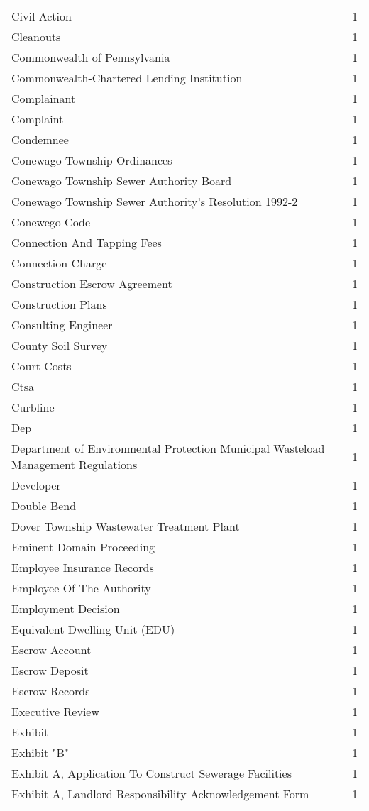 \begin{longtable}{p{} p{}}
Civil Action & 1 \\
Cleanouts & 1 \\
Commonwealth of Pennsylvania & 1 \\
Commonwealth-Chartered Lending Institution & 1 \\
Complainant & 1 \\
Complaint & 1 \\
Condemnee & 1 \\
Conewago Township Ordinances & 1 \\
Conewago Township Sewer Authority Board & 1 \\
Conewago Township Sewer Authority's Resolution 1992-2 & 1 \\
Conewego Code & 1 \\
Connection And Tapping Fees & 1 \\
Connection Charge & 1 \\
Construction Escrow Agreement & 1 \\
Construction Plans & 1 \\
Consulting Engineer & 1 \\
County Soil Survey & 1 \\
Court Costs & 1 \\
Ctsa & 1 \\
Curbline & 1 \\
Dep & 1 \\
Department of Environmental Protection Municipal Wasteload Management Regulations & 1 \\
Developer & 1 \\
Double Bend & 1 \\
Dover Township Wastewater Treatment Plant & 1 \\
Eminent Domain Proceeding & 1 \\
Employee Insurance Records & 1 \\
Employee Of The Authority & 1 \\
Employment Decision & 1 \\
Equivalent Dwelling Unit (EDU) & 1 \\
Escrow Account & 1 \\
Escrow Deposit & 1 \\
Escrow Records & 1 \\
Executive Review & 1 \\
Exhibit & 1 \\
Exhibit "B" & 1 \\
Exhibit A, Application To Construct Sewerage Facilities & 1 \\
Exhibit A, Landlord Responsibility Acknowledgement Form & 1 \\

\end{longtable}
